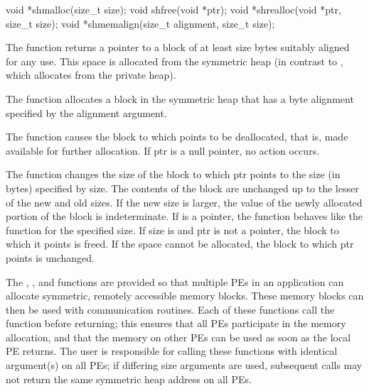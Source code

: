 \synC
void *shmalloc(size_t size);
void shfree(void *ptr);
void *shrealloc(void *ptr, size_t size);
void *shmemalign(size_t alignment, size_t size);%

{
       The  function returns a pointer to a block of at least size
       bytes suitably aligned for any use.  This space is allocated from the
       symmetric heap (in contrast to , which allocates from the
       private heap).

       The   function allocates a block in the symmetric heap that
       has a byte alignment specified by the alignment argument.

       The  function causes the block to which  points to be
       deallocated, that is, made available for further allocation.  If ptr is
       a null pointer, no action occurs. 
              
       The   function changes the size of the block to which ptr
       points to the size (in bytes) specified by size.  The contents of the
       block are unchanged up to the lesser of the new and old sizes.	 If the
       new size is larger, the value of the newly allocated portion of the
       block is indeterminate.  If  is a  pointer, the  function behaves like the  function for the specified size.  If size  is  and ptr is not a  pointer, the block to which it points is freed. If the space cannot be allocated, the block to which ptr points is unchanged.

       The , , and  functions are provided  so that multiple \ac{PE}s in an application can allocate symmetric, remotely
       accessible memory blocks.  These memory blocks can then be used with
       \openshmem communication routines.  Each of these functions call the
        function before returning; this ensures that all
       \ac{PE}s participate in the memory allocation, and that the memory on other
       \ac{PE}s can be used	as  soon as the local \ac{PE} returns.  The user is
       responsible for calling these functions with identical argument(s) on
       all \ac{PE}s; if differing size arguments are used, subsequent calls may not
       return the same symmetric heap address on all \ac{PE}s.
}
